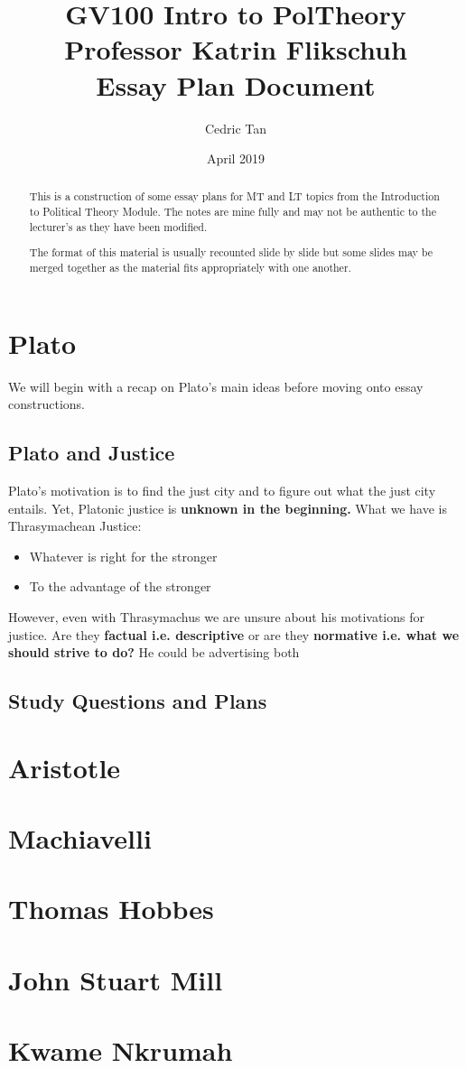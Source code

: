 \documentclass[12pt, letterpaper]{article}
\title{
	{GV100 Intro to PolTheory}\\
	{\large{Professor Katrin Flikschuh}}\\
	{\large{Essay Plan Document}}
}
\author{Cedric Tan}
\date{April 2019}
\begin{document}
\maketitle
\begin{abstract}

This is a construction of some essay plans for MT and LT topics from the Introduction to Political Theory Module. The notes are mine fully and may not be authentic to the lecturer's as they have been modified.

The format of this material is usually recounted slide by slide but some slides may be merged together as the material fits appropriately with one another.
\end{abstract}
\newpage
\tableofcontents
\newpage

\section{Plato}
We will begin with a recap on Plato's main ideas before moving onto essay constructions.
\subsection{Plato and Justice}
Plato's motivation is to find the just city and to figure out what the just city entails. Yet, Platonic justice is \textbf{unknown in the beginning.} What we have is Thrasymachean Justice:
\begin{itemize}
	\item Whatever is right for the stronger
	\item To the advantage of the stronger
\end{itemize}
However, even with Thrasymachus we are unsure about his motivations for justice. Are they \textbf{factual i.e. descriptive} or are they \textbf{normative i.e. what we should strive to do?} He could be advertising both

\subsection{Study Questions and Plans}

\newpage
\section{Aristotle}


\newpage
\section{Machiavelli}


\newpage
\section{Thomas Hobbes}


\newpage
\section{John Stuart Mill}


\newpage
\section{Kwame Nkrumah}
\end{document}
